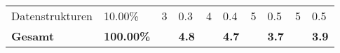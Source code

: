 \begin{sidewaystable}
\begin{tabular}{llllllllll}
		Datenstrukturen                           & 10.00\%                                                                             & 3                                                                                     & 0.3                                                                                & 4                                                                                     & 0.4                                                                                & 5                                                                                     & 0.5                                                                                & 5                                                                                     & 0.5                                                                                \\
		\rowcolor[HTML]{BBDAFF}
		\textbf{Gesamt}                           & \textbf{100.00\%}                                                                   & \textbf{}                                                                             & \textbf{4.8}                                                                       & \textbf{}                                                                             & \textbf{4.7}                                                                       & \textbf{}                                                                             & \textbf{3.7}                                                                       & \textbf{}                                                                             & \textbf{3.9}
	\end{tabular}
\end{sidewaystable}

